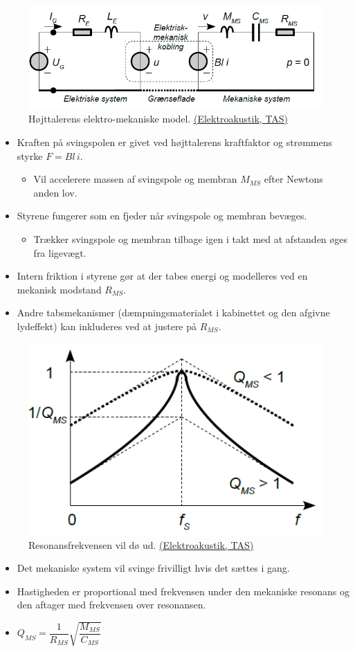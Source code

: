 \begin{figure} [H]
	\centering
	\includegraphics[width=0.95\linewidth]{graphics/24.png}
	\caption{Højttalerens elektro-mekaniske model. \href{http://www.torean.dk/artikel/Elektroakustik.pdf}{(Elektroakustik, TAS)}}
	\label{fig:24}
\end{figure}
\begin{itemize}
	\item Kraften på svingspolen er givet ved højttalerens kraftfaktor og strømmens styrke $F = Bl\, i$.
	\begin{itemize}
		\item Vil accelerere massen af svingspole og membran $M_{MS}$ efter Newtons anden lov. 
	\end{itemize} 	
	\item Styrene fungerer som en fjeder når svingspole og	membran bevæges.
	\begin{itemize}
		\item Trækker svingspole og membran tilbage igen i takt med at
		afstanden øges fra ligevægt.
	\end{itemize} 
	\item Intern friktion i styrene gør at der tabes energi og modelleres ved
	en mekanisk modstand $R_{MS}$. 
	\item Andre tabsmekanismer (dæmpningsmaterialet i kabinettet og den afgivne lydeffekt) kan inkluderes ved at justere på $R_{MS}$.
\end{itemize}

\begin{figure} [H]
	\centering
	\includegraphics[width=0.5\linewidth]{graphics/26.png}
	\caption{Resonansfrekvensen vil dø ud. \href{http://www.torean.dk/artikel/Elektroakustik.pdf}{(Elektroakustik, TAS)}}
	\label{fig:26}
\end{figure}
\begin{itemize}
	\item Det mekaniske system vil svinge frivilligt hvis det sættes i gang.
	\item Hastigheden er proportional med frekvensen under den mekaniske resonans og den	aftager med frekvensen over resonansen.
	\item $Q_{MS}= \dfrac{1}{R_{MS}}\sqrt{\dfrac{M_{MS}}{C_{MS}}}$
\end{itemize}


